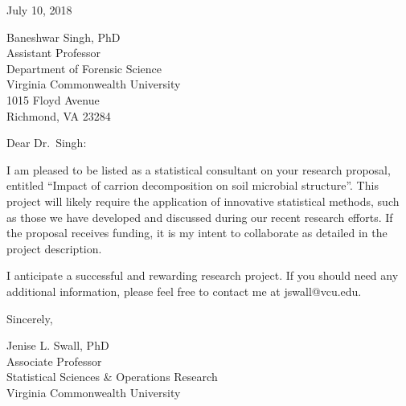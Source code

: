 \documentclass[12pt]{article}
\begin{document}
\pagestyle{empty}

\vspace*{0.5in}

\noindent July 10, 2018

\vspace*{0.3in}

\noindent Baneshwar Singh, PhD\\
Assistant Professor\\
Department of Forensic Science\\
Virginia Commonwealth University\\
1015 Floyd Avenue\\
Richmond, VA 23284


\vspace*{0.3in}

\noindent Dear Dr.~Singh:

\vspace{0.2in}

\noindent I am pleased to be listed as a statistical consultant on
your research proposal, entitled ``Impact of carrion decomposition on
soil microbial structure''.  This project will likely require the
application of innovative statistical methods, such as those we have
developed and discussed during our recent research efforts.  If the
proposal receives funding, it is my intent to collaborate as detailed
in the project description.

\vspace{0.2in}

\noindent I anticipate a successful and rewarding research project.
If you should need any additional information, please feel free to
contact me at jswall@vcu.edu.

\vspace*{0.3in}

\noindent Sincerely,

\vspace*{0.5in}

\noindent Jenise L. Swall, PhD\\
\noindent Associate Professor\\
\noindent Statistical Sciences \& Operations Research\\
\noindent Virginia Commonwealth University
\end{document}

